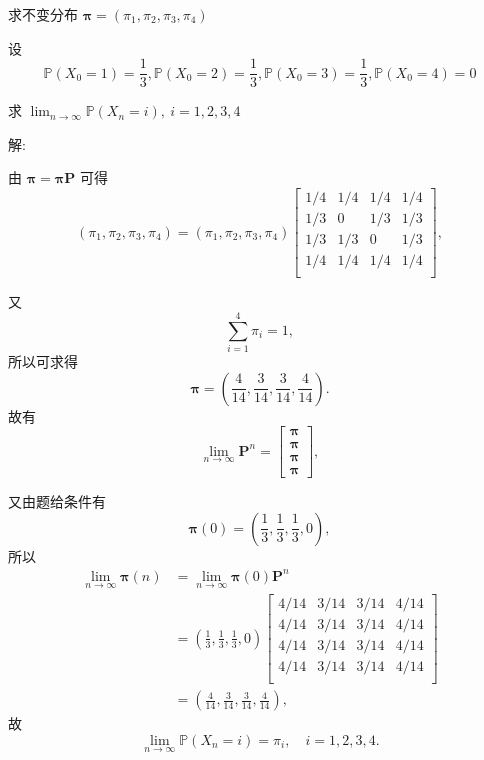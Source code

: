 \documentclass[openany]{ctexbook}
\theoremstyle{kaiti}
\theoremstyle{normal}
\begin{document}
求不变分布 $\bm{\pi}=(\pi_1,\pi_2,\pi_3,\pi_4)$

设
\begin{equation}
  \mathbb{P}(X_0=1)=\frac{1}{3},\mathbb{P}(X_0=2)=\frac{1}{3},\mathbb{P}(X_0=3)=\frac{1}{3},\mathbb{P}(X_0=4)=0
\end{equation}

求 $\lim_{n\to\infty}\mathbb{P}(X_n=i),~i=1,2,3,4$

解:

由 $\bm{\pi}=\bm{\pi}\bm{P}$ 可得
\begin{equation}
  (\pi_1,\pi_2,\pi_3,\pi_4)
  =(\pi_1,\pi_2,\pi_3,\pi_4)
  \begin{bmatrix}
    1/4 & 1/4 & 1/4 & 1/4 \\
    1/3 &  0  & 1/3 & 1/3 \\
    1/3 & 1/3 &  0  & 1/3 \\
    1/4 & 1/4 & 1/4 & 1/4 \\
  \end{bmatrix},
\end{equation}

又
\begin{equation}
  \sum_{i=1}^4\pi_i=1,
\end{equation}
所以可求得
\begin{equation}
  \bm{\pi}=\left(\frac{4}{14},\frac{3}{14},\frac{3}{14},\frac{4}{14}\right).
\end{equation}
故有
\begin{equation}
  \lim_{n\to\infty}\bm{P}^n=
  \begin{bmatrix}
    \bm{\pi}\\\bm{\pi}\\\bm{\pi}\\\bm{\pi}
  \end{bmatrix},
\end{equation}

又由题给条件有
\begin{equation}
  \bm{\pi}(0)=\left(\frac{1}{3},\frac{1}{3},\frac{1}{3},0\right),
\end{equation}
所以
\begin{equation}
  \begin{aligned}
    \lim_{n\to\infty}\bm{\pi}(n)
    &=\lim_{n\to\infty}\bm{\pi}(0)\bm{P}^n\\
    &=\left(\frac{1}{3},\frac{1}{3},\frac{1}{3},0\right)
    \begin{bmatrix}
      4/14 & 3/14 & 3/14 & 4/14 \\
      4/14 & 3/14 & 3/14 & 4/14 \\
      4/14 & 3/14 & 3/14 & 4/14 \\
      4/14 & 3/14 & 3/14 & 4/14 \\
    \end{bmatrix}\\
    &=\left(\frac{4}{14},\frac{3}{14},\frac{3}{14},\frac{4}{14}\right),
  \end{aligned}
\end{equation}
故
\begin{equation}
  \lim_{n\to\infty}\mathbb{P}(X_n=i)=\pi_i,\quad i=1,2,3,4.
\end{equation}
\end{document}
